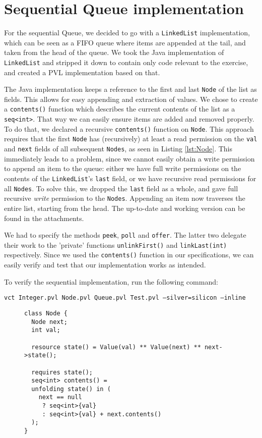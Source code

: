 \section{Sequential Queue implementation}

For the sequential Queue, we decided to go with a \texttt{LinkedList} implementation, which can be seen as a FIFO queue where items are appended at the tail, and taken from the head of the queue. We took the Java implementation of \texttt{LinkedList} and stripped it down to contain only code relevant to the exercise, and created a PVL implementation based on that.

The Java implementation keeps a reference to the first and last \texttt{Node} of the list as fields. This allows for easy appending and extraction of values.
We chose to create a \texttt{contents()} function which describes the current contents of the list as a \texttt{seq<int>}. That way we can easily ensure items are added and removed properly. To do that, we declared a recursive \texttt{contents()} function on \texttt{Node}. This approach requires that the first \texttt{Node} has (recursively) at least a read permission on the \texttt{val} and \texttt{next} fields of all subsequent \texttt{Nodes}, as seen in Listing \autoref{lst:Node}. This immediately leads to a problem, since we cannot easily obtain a write permission to append an item to the queue: either we have full write permissions on the contents of the \texttt{LinkedList}'s \texttt{last} field, or we have recursive read permissions for all \texttt{Nodes}. To solve this, we dropped the \texttt{last} field as a whole, and gave full recursive \emph{write} permission to the \texttt{Nodes}. Appending an item now traverses the entire list, starting from the head. The up-to-date and working version can be found in the attachments.

We had to specify the methods {\tt peek}, {\tt poll} and {\tt offer}. The latter two delegate their work to the 'private' functions {\tt unlinkFirst()} and {\tt linkLast(int)} respectively. Since we used the {\tt contents()} function in our specifications, we can easily verify and test that our implementation works as intended.

To verify the sequential implementation, run the following command:

\begin{center}
	{\tt vct Integer.pvl Node.pvl Queue.pvl Test.pvl --silver=silicon --inline}
\end{center}

\begin{figure}
\begin{lstlisting}[caption=Basic Node specification, captionpos=b]
class Node {
  Node next;
  int val;

  resource state() = Value(val) ** Value(next) ** next->state();

  requires state();
  seq<int> contents() =
  unfolding state() in (
    next == null
     ? seq<int>{val}
     : seq<int>{val} + next.contents()
  );
}
\end{lstlisting}
\label{lst:Node}
\end{figure}

